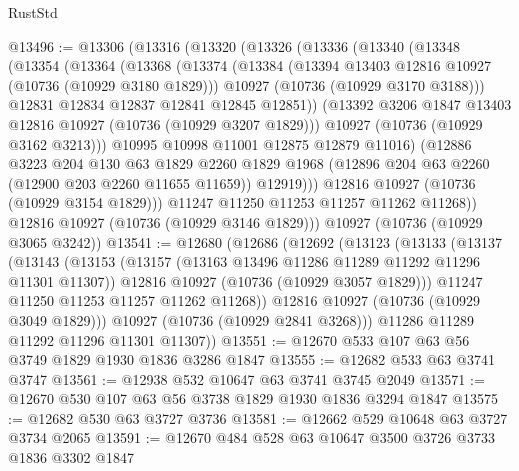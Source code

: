 \begin{lexlean}{RustStd}
\begin{coremodule}
@13496 := @13306
    (@13316
      (@13320
        (@13326
          (@13336
            (@13340
              (@13348
                (@13354
                  (@13364
                    (@13368
                      (@13374
                        (@13384
                          (@13394 @13403 @12816 @10927 (@10736 (@10929 @3180 @1829)))
                          @10927
                          (@10736 (@10929 @3170 @3188)))
                        @12831
                        @12834
                        @12837
                        @12841
                        @12845
                        @12851))
                    (@13392 @3206 @1847 @13403 @12816 @10927 (@10736 (@10929 @3207 @1829)))
                    @10927
                    (@10736 (@10929 @3162 @3213)))
                  @10995
                  @10998
                  @11001
                  @12875
                  @12879
                  @11016)
                (@12886
                  @3223
                  @204
                  @130
                  @63
                  @1829
                  @2260
                  @1829
                  @1968
                  (@12896 @204 @63 @2260 (@12900 @203 @2260 @11655 @11659))
                  @12919)))
            @12816
            @10927
            (@10736 (@10929 @3154 @1829)))
          @11247
          @11250
          @11253
          @11257
          @11262
          @11268))
      @12816
      @10927
      (@10736 (@10929 @3146 @1829)))
    @10927
    (@10736 (@10929 @3065 @3242))
@13541 := @12680
    (@12686
      (@12692
        (@13123
          (@13133
            (@13137
              (@13143
                (@13153
                  (@13157 (@13163 @13496 @11286 @11289 @11292 @11296 @11301 @11307))
                  @12816
                  @10927
                  (@10736 (@10929 @3057 @1829)))
                @11247
                @11250
                @11253
                @11257
                @11262
                @11268))
            @12816
            @10927
            (@10736 (@10929 @3049 @1829)))
          @10927
          (@10736 (@10929 @2841 @3268)))
        @11286
        @11289
        @11292
        @11296
        @11301
        @11307))
@13551 := @12670 @533 @107 @63 @56 @3749 @1829 @1930 @1836 @3286 @1847
@13555 := @12682 @533 @63 @3741 @3747
@13561 := @12938 @532 @10647 @63 @3741 @3745 @2049
@13571 := @12670 @530 @107 @63 @56 @3738 @1829 @1930 @1836 @3294 @1847
@13575 := @12682 @530 @63 @3727 @3736
@13581 := @12662 @529 @10648 @63 @3727 @3734 @2065
@13591 := @12670 @484 @528 @63 @10647 @3500 @3726 @3733 @1836 @3302 @1847

\end{coremodule}
\end{lexlean}
